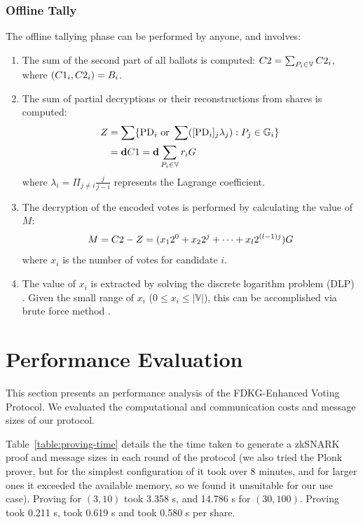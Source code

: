 \documentclass[lettersize,journal]{IEEEtran}
\theoremstyle{definition}
\begin{document}
\subsubsection{Offline Tally}

The offline tallying phase can be performed by anyone, and involves:

\begin{enumerate}
    \item The sum of the second part of all ballots is computed: $C2 = \sum_{P_{i} \in \mathbb{V}} C2_{i}$, where $(C1_{i},C2_{i})=B_{i}$.
  \item The sum of partial decryptions or their reconstructions from shares is computed:
    \begin{align}
        Z &= \sum\{\mathrm{PD}_{i} \textrm{ or } \sum ([\mathrm{PD}_{i}]_{j} \lambda_{j}) : P_{j} \in \mathbb{G}_{i}\} \\
          &= \textbf{d}{} C1 = \mathbf{d} \sum_{P_{i} \in \mathbb{V}} r_i G
    \end{align}
    where $\lambda_{i}=\Pi_{j \neq i}\frac{j}{j-i}$ represents the Lagrange coefficient.
 
     \item The decryption of the encoded votes is performed by calculating the value of $M$:
     \[M=C2 - Z=(x_1 2^0 + x_2 2^j + \dots + x_l 2^{(l-1)j}) G\] where $x_i$ is the number of votes for candidate $i$.
    \item The value of $x_i$ is extracted by solving the discrete logarithm problem (DLP) . Given the small range of $x_i$ ($0 \leq x_i \leq |\mathbb{V}|$), this can be accomplished via brute force method \cite{haoAnonymousVotingTworound2010}.
\end{enumerate}

\section{Performance Evaluation}
\label{sec:performance_evaluation}

This section presents an performance analysis of the FDKG-Enhanced Voting Protocol. We evaluated the computational and communication costs and message sizes of our protocol.

Table~\ref{table:proving-time} details the the time taken to generate a zkSNARK proof and message sizes in each round of the protocol (we also tried the Plonk prover, but for the simplest configuration of \ProofFDKG{} it took over 8 minutes, and for larger ones it exceeded the available memory, so we found it unsuitable for our use case). Proving \ProofFDKG{} for $(3,10)$ took 3.358 s, and 14.786 s for $(30,100)$. Proving \ProofBALLOT{} took 0.211 s, \ProofPD{} took 0.619 s and  took 0.580 s per share.
\end{document}
